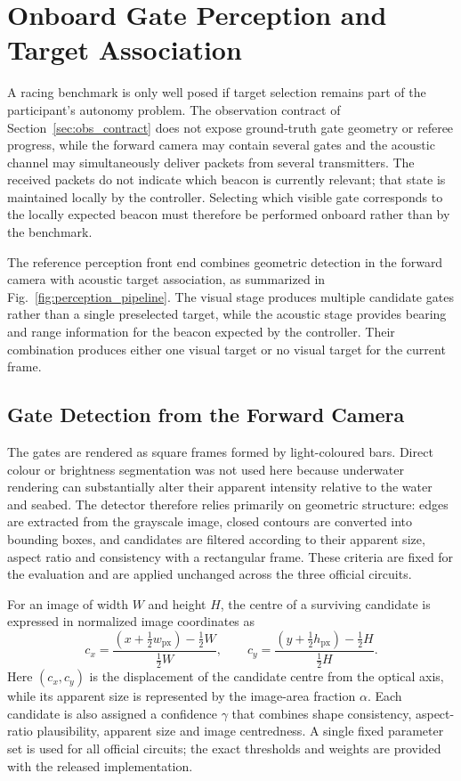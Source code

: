\section{Onboard Gate Perception and Target Association}
\label{sec:perception}

A racing benchmark is only well posed if target selection remains part of the
participant's autonomy problem. The observation contract of
Section~\ref{sec:obs_contract} does not expose ground-truth gate geometry or
referee progress, while the forward camera may contain several gates and the
acoustic channel may simultaneously deliver packets from several transmitters.
The received packets do not indicate which beacon is currently relevant; that
state is maintained locally by the controller. Selecting which visible gate
corresponds to the locally expected beacon must therefore be performed onboard
rather than by the benchmark.

The reference perception front end combines geometric detection in the forward
camera with acoustic target association, as summarized in
Fig.~\ref{fig:perception_pipeline}. The visual stage produces multiple candidate
gates rather than a single preselected target, while the acoustic stage provides
bearing and range information for the beacon expected by the controller. Their
combination produces either one visual target or no visual target for the
current frame.




\subsection{Gate Detection from the Forward Camera}

The gates are rendered as square frames formed by light-coloured bars. Direct
colour or brightness segmentation was not used here because underwater
rendering can substantially alter their apparent intensity relative to the
water and seabed. The detector therefore relies primarily on geometric
structure: edges are extracted from the grayscale image, closed contours are
converted into
bounding boxes, and candidates are filtered according to their apparent size,
aspect ratio and consistency with a rectangular frame. These criteria are fixed
for the evaluation and are applied unchanged across the three official
circuits.

For an image of width $W$ and height $H$, the centre of a surviving candidate
is expressed in normalized image coordinates as
\begin{equation}
\label{eq:vision_center}
c_x=
\frac{(x+\tfrac{1}{2}w_{\mathrm{px}})-\tfrac{1}{2}W}
{\tfrac{1}{2}W},
\qquad
c_y=
\frac{(y+\tfrac{1}{2}h_{\mathrm{px}})-\tfrac{1}{2}H}
{\tfrac{1}{2}H}.
\end{equation}
Here $(c_x,c_y)$ is the displacement of the candidate centre from the optical
axis, while its apparent size is represented by the image-area fraction
$\alpha$. Each candidate is also assigned a confidence $\gamma$ that combines
shape consistency, aspect-ratio plausibility, apparent size and image
centredness. A single fixed parameter set is used for all official circuits;
the exact thresholds and weights are provided with the released implementation.

